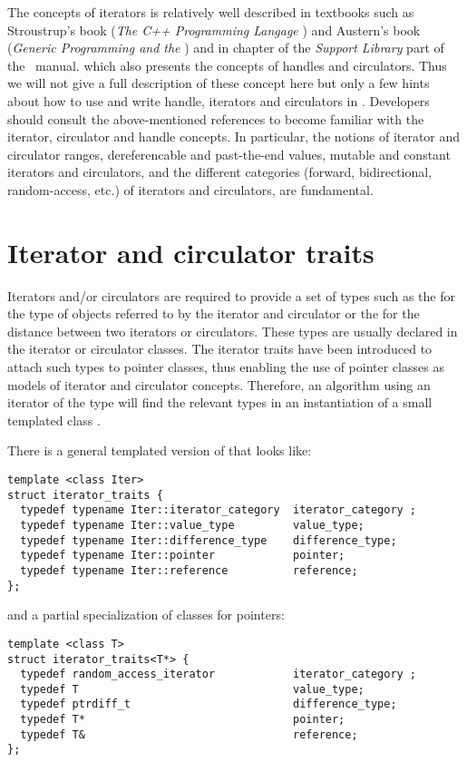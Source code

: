 The concepts of iterators is relatively well described in textbooks such as 
Stroustrup's book ({\em The C++ Programming Langage} \cite{cgal:s-cpl-97})
and Austern's book ({\em Generic Programming and the \stl} \cite{cgal:a-gps-98})
and in chapter  of the 
{\em Support Library} part of the \cgal\ manual.
which also presents the concepts of handles and circulators.
Thus we will not give a full description of these concept here
but only a few hints about how to use and write handle, iterators and circulators in \cgal.  Developers should consult the above-mentioned references to become
familiar with the iterator, circulator and handle concepts. In 
particular,  the notions of iterator and circulator ranges,
dereferencable and past-the-end values,
 mutable and constant iterators and circulators, 
and the different categories (forward, bidirectional, random-access, etc.) 
of iterators and circulators, are fundamental.


\section{Iterator and circulator traits\label{sec:iterator_traits}}

Iterators and/or circulators are required to provide a set 
of types such as the  for the type of objects referred to by the iterator and circulator or the 
 for the distance between two iterators or circulators.
These types are usually declared in the iterator or circulator classes. 
The iterator traits have been introduced to attach such types to pointer classes, thus enabling the  use of pointer classes as models of  iterator
and circulator concepts.  
Therefore, an algorithm using an iterator of the type  will find the 
relevant types in an instantiation of a small templated class 
.

There is a  general templated version
of  that looks like:
\begin{verbatim}
template <class Iter> 
struct iterator_traits {
  typedef typename Iter::iterator_category  iterator_category ;
  typedef typename Iter::value_type         value_type;
  typedef typename Iter::difference_type    difference_type;
  typedef typename Iter::pointer            pointer;
  typedef typename Iter::reference          reference;
};
\end{verbatim}
and a partial specialization of  classes for pointers:
\begin{verbatim}
template <class T> 
struct iterator_traits<T*> {
  typedef random_access_iterator            iterator_category ;
  typedef T                                 value_type;
  typedef ptrdiff_t                         difference_type;
  typedef T*                                pointer;
  typedef T&                                reference;
};
\end{verbatim}

